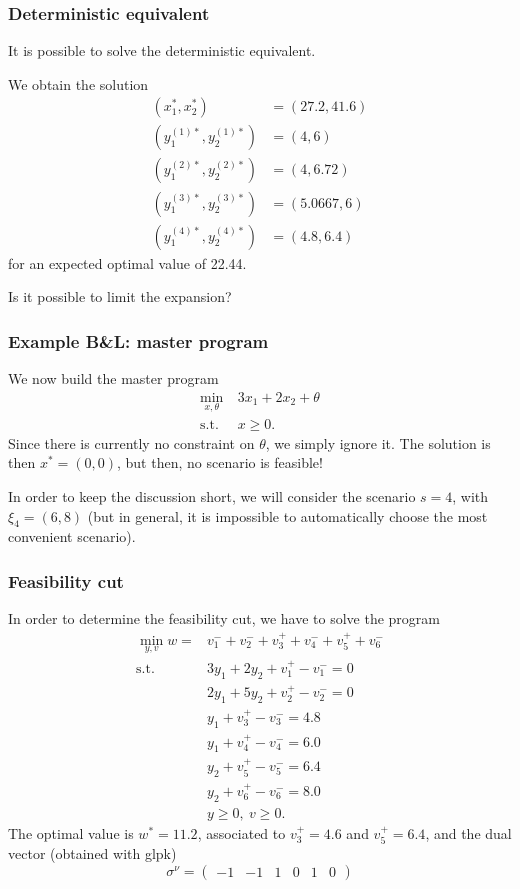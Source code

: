 \documentclass{beamer}
\begin{document}
\begin{frame}
\frametitle{Deterministic equivalent}

It is possible to solve the deterministic equivalent.

\mbox{}

We obtain the solution
\begin{align*}
(x_1^*, x_2^*) &= (27.2, 41.6) \\
\left(y^{(1)*}_1, y^{(1)*}_2\right) &= (4,6) \\
\left(y^{(2)*}_1, y^{(2)*}_2\right) &= (4,6.72) \\
\left(y^{(3)*}_1, y^{(3)*}_2\right) &= (5.0667,6) \\
\left(y^{(4)*}_1, y^{(4)*}_2\right) &= (4.8,6.4)
\end{align*}
for an expected optimal value of 22.44.

Is it possible to limit the expansion?

\end{frame}

\begin{frame}
	\frametitle{Example B\&L: master program}
	
	We now build the master program
	\begin{align}
	\min_{x, \theta}\ & 3x_1 + 2x_2 + \theta \\
	\mbox{s.t. } & x \geq 0.
	\end{align}
	Since there is currently no constraint on $\theta$, we simply ignore it.
	The solution is then $x^* = (0,0)$, but then, no scenario is feasible!
	
	\mbox{}
	
	In order to keep the discussion short, we will consider the scenario $s = 4$, with $\xi_4 = (6,8)$ (but in general, it is impossible to automatically choose the most convenient scenario).
	
\end{frame}

\begin{frame}
	\frametitle{Feasibility cut}
	
	In order to determine the feasibility cut, we have to solve the program
	\begin{align*}
	\min_{y,v} w = & v_1^-+v_2^-+v_3^++v_4^-+v_5^++v_6^- \\
	\mbox{s.t. } & 3y_1 + 2y_2 + v_1^+ - v_1^- = 0 \\
	& 2y_1 + 5y_2 + v_2^+ - v_2^- = 0 \\
	& y_1 + v_3^+ - v_3^- = 4.8 \\
	& y_1 + v_4^+ - v_4^- = 6.0 \\
	& y_2 + v_5^+ - v_5^- = 6.4 \\
	& y_2 + v_6^+ - v_6^- = 8.0 \\
	& y \geq 0,\ v \geq 0.
	\end{align*}
	The optimal value is $w^* = 11.2$, associated to $v^+_3 = 4.6$ and $v^+_5 = 6.4$, and the dual vector (obtained with glpk)
	\[
	\sigma^{\nu} = \begin{pmatrix} -1 & -1 & 1 & 0 & 1 & 0 \end{pmatrix}
	\]
	
\end{frame}
\end{document}
